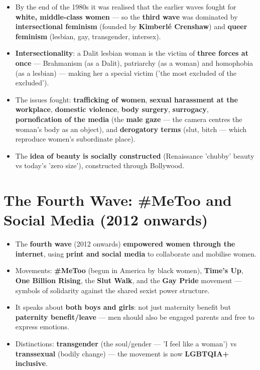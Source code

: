 \begin{KeyConcept}
\begin{itemize}
\item By the end of the 1980s it was realised that the earlier waves fought for \textbf{white, middle-class women} --- so the \textbf{third wave} was dominated by \textbf{intersectional feminism} (founded by \textbf{Kimberlé Crenshaw}) and \textbf{queer feminism} (lesbian, gay, transgender, intersex).
\item \textbf{Intersectionality}: a Dalit lesbian woman is the victim of \textbf{three forces at once} --- Brahmanism (as a Dalit), patriarchy (as a woman) and homophobia (as a lesbian) --- making her a special victim ('the most excluded of the excluded').
\item The issues fought: \textbf{trafficking of women}, \textbf{sexual harassment at the workplace}, \textbf{domestic violence}, \textbf{body surgery}, \textbf{surrogacy}, \textbf{pornofication of the media} (the \textbf{male gaze} --- the camera centres the woman's body as an object), and \textbf{derogatory terms} (slut, bitch --- which reproduce women's subordinate place).
\item The \textbf{idea of beauty is socially constructed} (Renaissance 'chubby' beauty vs today's 'zero size'), constructed through Bollywood.
\end{itemize}
\end{KeyConcept}

\section{The Fourth Wave: \#MeToo and Social Media (2012 onwards)}

\begin{KeyConcept}
\begin{itemize}
\item The \textbf{fourth wave} (2012 onwards) \textbf{empowered women through the internet}, using \textbf{print and social media} to collaborate and mobilise women.
\item Movements: \textbf{\#MeToo} (begun in America by black women), \textbf{Time's Up}, \textbf{One Billion Rising}, the \textbf{Slut Walk}, and the \textbf{Gay Pride} movement --- symbols of solidarity against the shared sexist power structure.
\item It speaks about \textbf{both boys and girls}: not just maternity benefit but \textbf{paternity benefit/leave} --- men should also be engaged parents and free to express emotions.
\item Distinctions: \textbf{transgender} (the soul/gender --- 'I feel like a woman') vs \textbf{transsexual} (bodily change) --- the movement is now \textbf{LGBTQIA+ inclusive}.
\end{itemize}
\end{KeyConcept}

